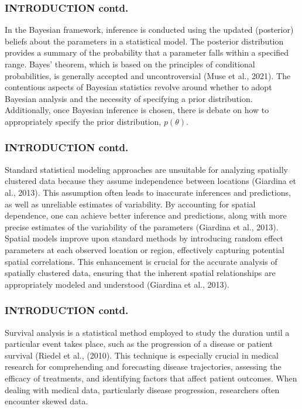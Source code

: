 \documentclass{beamer}
\begin{document}
\begin{frame}
\frametitle{INTRODUCTION contd.}

In the Bayesian framework, inference is conducted using the updated (posterior) beliefs about the parameters in a statistical model. The posterior distribution provides a summary of the probability that a parameter falls within a specified range. Bayes' theorem, which is based on the principles of conditional probabilities, is generally accepted and uncontroversial (Muse et al., 2021). The contentious aspects of Bayesian statistics revolve around whether to adopt Bayesian analysis and the necessity of specifying a prior distribution. Additionally, once Bayesian inference is chosen, there is debate on how to appropriately specify the prior distribution, \( p(\theta) \).


\end{frame}

\begin{frame}
\frametitle{INTRODUCTION contd.}
Standard statistical modeling approaches are unsuitable for analyzing spatially clustered data because they assume independence between locations (Giardina et al., 2013). This assumption often leads to inaccurate inferences and predictions, as well as unreliable estimates of variability. By accounting for spatial dependence, one can achieve better inference and predictions, along with more precise estimates of the variability of the parameters (Giardina et al., 2013). Spatial models improve upon standard methods by introducing random effect parameters at each observed location or region, effectively capturing potential spatial correlations. This enhancement is crucial for the accurate analysis of spatially clustered data, ensuring that the inherent spatial relationships are appropriately modeled and understood (Giardina et al., 2013). 
\end{frame}


\begin{frame}
\frametitle{INTRODUCTION contd.}
Survival analysis is a statistical method employed to study the duration until a particular event takes place, such as the progression of a disease or patient survival (Riedel et al., (2010). This technique is especially crucial in medical research for comprehending and forecasting disease trajectories, assessing the efficacy of treatments, and identifying factors that affect patient outcomes. When dealing with medical data, particularly disease progression, researchers often encounter skewed data.
\end{frame}
\end{document}
